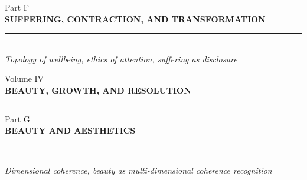 \documentclass[11pt,letterpaper,openany]{book}
\begin{document}
\clearpage
\thispagestyle{empty}
\vspace*{5cm}
\begin{center}
{\large\sffamily\color{partgray}Part F}\\[0.5cm]
{\Huge\sffamily\bfseries\color{headerblue} SUFFERING, CONTRACTION, AND TRANSFORMATION}\\[0.5cm]
{\color{rulegray}\rule{5cm}{0.3pt}}\\[1cm]
{\normalsize\itshape\color{partgray}Topology of wellbeing, ethics of attention, suffering as disclosure}
\end{center}
\clearpage
{}







\clearpage
\thispagestyle{empty}
\vspace*{4cm}
\begin{center}
{\large\sffamily\color{partgray}Volume IV}\\[0.8cm]
{\fontsize{28}{34}\selectfont\sffamily\bfseries\color{headerblue} BEAUTY, GROWTH, AND RESOLUTION}\\[1cm]
{\color{rulegray}\rule{6cm}{0.4pt}}
\end{center}
\clearpage


\clearpage
\thispagestyle{empty}
\vspace*{5cm}
\begin{center}
{\large\sffamily\color{partgray}Part G}\\[0.5cm]
{\Huge\sffamily\bfseries\color{headerblue} BEAUTY AND AESTHETICS}\\[0.5cm]
{\color{rulegray}\rule{5cm}{0.3pt}}\\[1cm]
{\normalsize\itshape\color{partgray}Dimensional coherence, beauty as multi-dimensional coherence recognition}
\end{center}
\clearpage
{}




\end{document}

